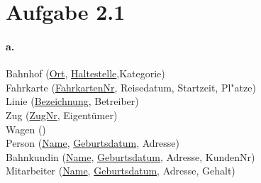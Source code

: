 \documentclass[12pt]{article}
\begin{document}
	
	
	
	
	\section*{Aufgabe 2.1}
	
	
	
		

		\paragraph*{a.}
			Bahnhof (\underline{Ort}, \underline{Haltestelle},Kategorie)\\[1.3em]
			
			Fahrkarte (\underline{FahrkartenNr}, Reisedatum, Startzeit, Pl"atze)\\[1.3em]
			
			Linie (\underline{Bezeichnung}, Betreiber)\\[1.3em]
			
			Zug (\underline{ZugNr}, Eigentümer)\\[1.3em]
			
			Wagen ()\\[1.3em]
			
			Person (\underline{Name}, \underline{Geburtsdatum}, Adresse) \\[1,3em]
			
			Bahnkundin (\underline{Name}, \underline{Geburtsdatum}, Adresse, KundenNr)\\[1,3em]
			
			Mitarbeiter (\underline{Name}, \underline{Geburtsdatum},  Adresse, Gehalt)\\[1,3em]
		
		
\end{document}
